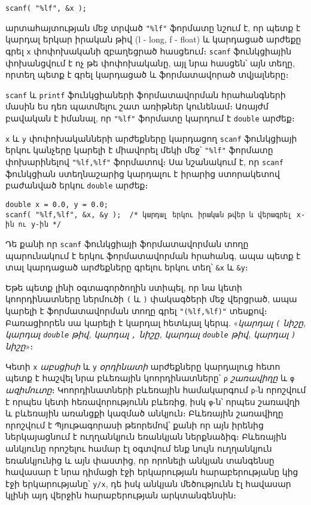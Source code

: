 \begin{Verbatim}
scanf( "%lf", &x );
\end{Verbatim}

արտահայտության մեջ տրված \texttt{"\%lf"} ֆորմատը նշում է, որ պետք է
կարդալ երկար իրական թիվ (l - long, f - float) և կարդացած արժեքը գրել
\texttt{x} փոփոխականի զբաղեցրած հասցեում։ \texttt{scanf} ֆունկցիային
փոխանցվում է ոչ թե փոփոխականը, այլ նրա հասցեն՝ այն տեղը, որտեղ պետք է
գրել կարդացած և ֆորմատավորած տվյալները։

\texttt{scanf} և \texttt{printf} ֆունկցիաների ֆորմատավորման հրահանգների
մասին ես դեռ պատմելու շատ առիթներ կունենամ։ Առայժմ բավական է իմանալ, որ
\texttt{"\%lf"} ֆորմատը կարդում է \texttt{double} արժեք։

\texttt{x} և \texttt{y} փոփոխականների արժեքները կարդացող \texttt{scanf}
ֆունկցիայի երկու կանչերը կարելի է միավորել մեկի մեջ՝ \texttt{"\%lf"}
ֆորմատը փոխարինելով \texttt{"\%lf,\%lf"} ֆորմատով։ Սա նշանակում է, որ
\texttt{scanf} ֆունկցիան ստեղնաշարից կարդալու է իրարից ստորակետով
բաժանված երկու \texttt{double} արժեք։

\begin{Verbatim}
double x = 0.0, y = 0.0;
scanf( "%lf,%lf", &x, &y );  /* կարդալ երկու իրական թվեր և վերագրել x-ին ու y-ին */
\end{Verbatim}

Դե քանի որ \texttt{scanf} ֆունկցիայի ֆորմատավորման տողը պարունակում է
երկու ֆորմատավորման հրահանգ, ապա պետք է տալ կարդացած արժեքները գրելու
երկու տեղ՝ \texttt{\&x} և \texttt{\&y}։

Եթե պետք լինի օգտագործողին ստիպել, որ նա կետի կոորդինատները ներմուծի
\texttt{(} և \texttt{)} փակագծերի մեջ վերցրած, ապա կարելի է
ֆորմատավորման տողը գրել \texttt{"(\%lf,\%lf)"} տեսքով։ Բառացիորեն սա
կարելի է կարդալ հետևյալ կերպ. «\emph{կարդալ \texttt{(} նիշը, կարդալ
\texttt{double} թիվ, կարդալ \texttt{,} նիշը, կարդալ \texttt{double} թիվ,
կարդալ \texttt{)} նիշը}»։

Կետի \texttt{x} \emph{աբսցիսի} և \texttt{y} \emph{օրդինատի} արժեքները
կարդալուց հետո պետք է հաշվել նրա բևեռային կոորդինատները՝ \texttt{ρ}
\emph{շառավիղը} և \texttt{φ} \emph{ազիմուտը}։ Կոորդինատների բևեռային
համակարգում \texttt{ρ}-ն որոշվում է որպես կետի հեռավորությունն բևեռից,
իսկ \texttt{φ}-ն՝ որպես շառավղի և բևեռային առանցքի կազմած անկյուն։
Բևեռային շառավիղը որոշվում է Պյութագորասի թեորեմով՝ քանի որ այն իրենից
ներկայացնում է ուղղանկյուն եռանկյան ներքնաձիգ։ Բևեռային անկյունը
որոշելու համար էլ օգտվում ենք նույն ուղղանկյուն եռանկյունից և այն
փաստից, որ որոնելի անկյան տանգենսը հավասար է նրա դիմացի էջի երկարության
հարաբերությանը կից էջի երկարությանը՝ \texttt{y/x}, դե իսկ անկյան
մեծությունն էլ հավասար կլինի այդ վերջին հարաբերության արկտանգենսին։

